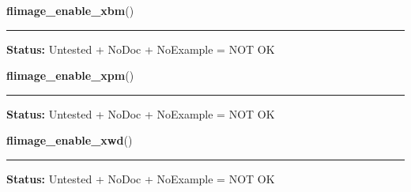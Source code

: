     \label{xformslib:library:flimage_enable_xbm}

    \vspace{0.5ex}

\hspace{.8\funcindent}\begin{boxedminipage}{\funcwidth}

    \raggedright \textbf{flimage\_enable\_xbm}()

    \vspace{-1.5ex}

    \rule{\textwidth}{0.5\fboxrule}
\setlength{\parskip}{2ex}
\setlength{\parskip}{1ex}
\textbf{Status:} Untested + NoDoc + NoExample = NOT OK



    \end{boxedminipage}

    \label{xformslib:library:flimage_enable_xpm}

    \vspace{0.5ex}

\hspace{.8\funcindent}\begin{boxedminipage}{\funcwidth}

    \raggedright \textbf{flimage\_enable\_xpm}()

    \vspace{-1.5ex}

    \rule{\textwidth}{0.5\fboxrule}
\setlength{\parskip}{2ex}
\setlength{\parskip}{1ex}
\textbf{Status:} Untested + NoDoc + NoExample = NOT OK



    \end{boxedminipage}

    \label{xformslib:library:flimage_enable_xwd}

    \vspace{0.5ex}

\hspace{.8\funcindent}\begin{boxedminipage}{\funcwidth}

    \raggedright \textbf{flimage\_enable\_xwd}()

    \vspace{-1.5ex}

    \rule{\textwidth}{0.5\fboxrule}
\setlength{\parskip}{2ex}
\setlength{\parskip}{1ex}
\textbf{Status:} Untested + NoDoc + NoExample = NOT OK



    \end{boxedminipage}

